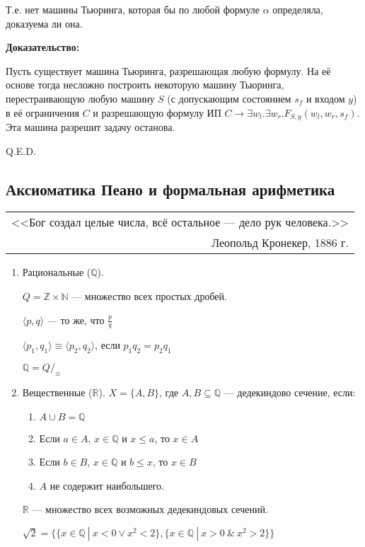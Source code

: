 Т.е. нет машины Тьюринга, которая бы по любой формуле $\alpha$ определяла, доказуема ли она.

\textbf{Доказательство:}

Пусть существует машина Тьюринга, разрешающая любую формулу. 
На её основе тогда несложно построить некоторую машину Тьюринга, перестраивающую любую машину $S$ (с допускающим состоянием $s_f$ и входом $y$) 
в её ограничения $C$ и разрешающую формулу ИП $C \rightarrow \exists w_l.\exists w_r.F_{S,y}(w_l,w_r,s_f)$. 
Эта машина разрешит задачу останова.

\hfill Q.E.D.

\subsection{Аксиоматика Пеано и формальная арифметика}

{\itshape \hfill \begin{tabular}{r} <<Бог создал целые числа, всё остальное — дело рук человека.>>\\
                                 Леопольд Кронекер, 1886 г.\end{tabular}}

\begin{enumerate}
\item Рациональные ($\mathbb{Q}$).

      $Q = \mathbb{Z} \times \mathbb{N}$ --- множество всех простых дробей.

      $\langle p,q \rangle$ --- то же, что $\frac{p}{q}$ 

      $\langle p_1,q_1 \rangle \equiv \langle p_2, q_2 \rangle$, если $p_1q_2 = p_2q_1$

      $\mathbb{Q} = Q/_\equiv$

\item Вещественные ($\mathbb{R}$). $X = \{ A, B \}$, где $A,B \subseteq \mathbb{Q}$ --- дедекиндово сечение, если:
\begin{enumerate}
\item $A\cup B = \mathbb{Q}$
\item Если $a \in A$, $x \in \mathbb{Q}$ и $x \le a$, то $x \in A$
\item Если $b \in B$, $x \in \mathbb{Q}$ и $b \le x$, то $x \in B$
\item $A$ не содержит наибольшего.
\end{enumerate}

       $\mathbb{R}$ --- множество всех возможных дедекиндовых сечений. 

$\sqrt 2 = \{\{ x\in\mathbb{Q}\ |\ x < 0 \vee x^2 < 2 \}, \{ x\in\mathbb{Q}\ |\ x > 0 \ \& \ x^2 > 2\}\}$
\end{enumerate}

